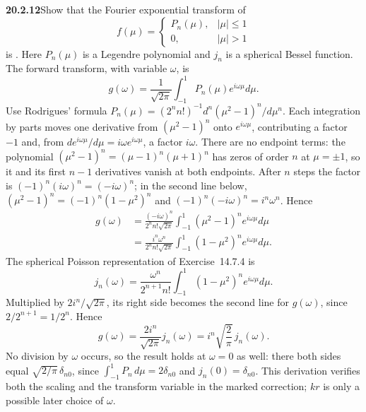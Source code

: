 \par\bigskip
\noindent\textbf{20.2.12}\quad Show that the Fourier exponential
transform of
\[
f(\mu)=\begin{cases}
P_{n}(\mu), & |\mu| \le 1\\
0, & |\mu| > 1
\end{cases}
\]
is . Here $P_{n}(\mu)$ is a
Legendre polynomial and $j_{n}$ is a spherical Bessel function.
\solution
The forward transform, with variable $\omega$, is
\[
g(\omega)=\frac1{\sqrt{2\pi}}\int_{-1}^1
P_n(\mu)e^{i\omega\mu}d\mu.
\]
Use Rodrigues' formula
$P_n(\mu)=(2^nn!)^{-1}d^n(\mu^2-1)^n/d\mu^n$.
Each integration by parts moves one derivative from
$(\mu^2-1)^n$ onto $e^{i\omega\mu}$, contributing a factor $-1$
and, from $de^{i\omega\mu}/d\mu=i\omega e^{i\omega\mu}$, a factor
$i\omega$. There are no endpoint terms: the polynomial
$(\mu^2-1)^n=(\mu-1)^n(\mu+1)^n$ has zeros of order $n$ at
$\mu=\pm1$, so it and its first $n-1$ derivatives vanish
at both endpoints. After $n$ steps the factor is
$(-1)^n(i\omega)^n=(-i\omega)^n$; in the second line below,
$(\mu^2-1)^n=(-1)^n(1-\mu^2)^n$ and $(-1)^n(-i\omega)^n=i^n\omega^n$.
Hence
\begin{align*}
g(\omega)
&=\frac{(-i\omega)^n}{2^nn!\sqrt{2\pi}}
\int_{-1}^1(\mu^2-1)^ne^{i\omega\mu}d\mu\\
&=\frac{i^n\omega^n}{2^nn!\sqrt{2\pi}}
\int_{-1}^1(1-\mu^2)^ne^{i\omega\mu}d\mu.
\end{align*}
The spherical Poisson representation of Exercise~14.7.4 is
\[
j_n(\omega)=\frac{\omega^n}{2^{n+1}n!}
\int_{-1}^1(1-\mu^2)^ne^{i\omega\mu}d\mu.
\]
Multiplied by $2i^n/\sqrt{2\pi}$, its right side becomes the
second line for $g(\omega)$, since $2/2^{n+1}=1/2^n$. Hence
\[
\boxed{g(\omega)=\frac{2i^n}{\sqrt{2\pi}}j_n(\omega)
=i^n\sqrt{\frac2\pi}\,j_n(\omega)}.
\]
No division by $\omega$ occurs, so the result holds at $\omega=0$
as well: there both sides equal $\sqrt{2/\pi}\,\delta_{n0}$, since
$\int_{-1}^1P_n\,d\mu=2\delta_{n0}$ and $j_n(0)=\delta_{n0}$.
This derivation verifies
both the scaling and the transform variable in the marked
correction; $kr$ is only a possible later choice of $\omega$.

